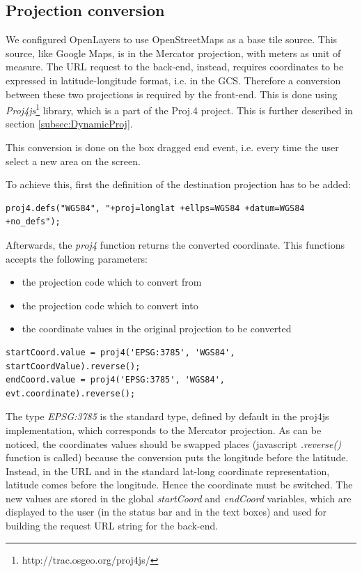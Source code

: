 \documentclass[11pt,a4paper,titlepage,oneside]{report}
\begin{document}
\subsection{Projection conversion}
We configured OpenLayers to use OpenStreetMaps as a base tile source. This source, like Google Maps, is in the Mercator projection, with meters as unit of measure.
The \gls{URL} request to the \gls{back-end}, instead, requires coordinates to be expressed in latitude-longitude format, i.e. in the \gls{GCS}. 
Therefore a conversion between these two projections is required by the front-end.
This is done using \textit{Proj4js}\footnote{http://trac.osgeo.org/proj4js/} library, which is a part of the Proj.4 project. This is further described in section \ref{subsec:DynamicProj}.

This conversion is done on the box dragged end event, i.e. every time the user select a new area on the screen.

To achieve this, first the definition of the destination projection has to be added:
\begin{lstlisting}
proj4.defs("WGS84", "+proj=longlat +ellps=WGS84 +datum=WGS84 +no_defs");
\end{lstlisting}

Afterwards, the \textit{proj4} function returns the converted coordinate. This functions accepts the following parameters:
\begin{itemize}
\item the projection code which to convert from
\item the projection code which to convert into
\item the coordinate values in the original projection to be converted
\end{itemize}

\begin{lstlisting}
startCoord.value = proj4('EPSG:3785', 'WGS84', startCoordValue).reverse();
endCoord.value = proj4('EPSG:3785', 'WGS84', evt.coordinate).reverse();
\end{lstlisting}

The type \textit{EPSG:3785} is the standard type, defined by default in the proj4js implementation, which corresponds to the Mercator projection.
As can be noticed, the coordinates values should be swapped places (javascript \textit{.reverse()} function is called) because the conversion puts the longitude before the latitude. Instead, in the URL and in the standard lat-long coordinate representation, latitude comes before the longitude. Hence the coordinate must be switched.
The new values are stored in the global \textit{startCoord} and \textit{endCoord} variables, which are displayed to the user (in the status bar and in the text boxes) and used for building the request URL string for the back-end.
\end{document}
